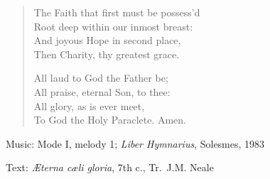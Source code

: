 \hymn



\setlength{\vleftmargin}{2em}
\begin{verse}
The Faith that first must be possess'd\\
Root deep within our inmost breast:\\
And joyous Hope in second place,\\
Then Charity, thy greatest grace.

All laud to God the Father be;\\
All praise, eternal Son, to thee:\\
All glory, as is ever meet,\\
To God the Holy Paraclete. Amen.
\end{verse}
\setlength{\vleftmargin}{\defleftmargini}

\begin{hymnsource}
Music: Mode I, melody 1; \emph{Liber Hymnarius}, Solesmes, 1983

Text: \emph{Æterna cæli gloria}, 7th c., Tr.\ J.M. Neale
\end{hymnsource}
